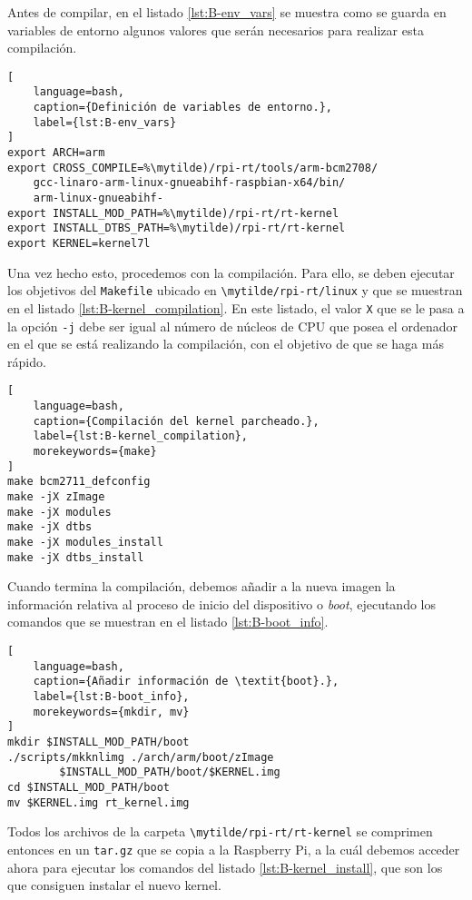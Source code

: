 Antes de compilar, en el listado \ref{lst:B-env_vars} se muestra como se guarda
en variables de entorno algunos valores que serán necesarios para realizar esta
compilación.

\begin{lstlisting}[
    language=bash,
    caption={Definición de variables de entorno.},
    label={lst:B-env_vars}
]
export ARCH=arm
export CROSS_COMPILE=%\mytilde)/rpi-rt/tools/arm-bcm2708/
    gcc-linaro-arm-linux-gnueabihf-raspbian-x64/bin/
    arm-linux-gnueabihf-
export INSTALL_MOD_PATH=%\mytilde)/rpi-rt/rt-kernel
export INSTALL_DTBS_PATH=%\mytilde)/rpi-rt/rt-kernel
export KERNEL=kernel7l
\end{lstlisting}

Una vez hecho esto, procedemos con la compilación. Para ello, se deben ejecutar
los objetivos del \texttt{Makefile} ubicado en \lstinline{\mytilde/rpi-rt/linux}
y que se muestran en el listado \ref{lst:B-kernel_compilation}. En este listado,
el valor \texttt{X} que se le pasa a la opción \texttt{-j} debe ser igual al
número de núcleos de CPU que posea el ordenador en el que se está realizando la
compilación, con el objetivo de que se haga más rápido.

\begin{lstlisting}[
    language=bash,
    caption={Compilación del kernel parcheado.},
    label={lst:B-kernel_compilation},
    morekeywords={make}
]
make bcm2711_defconfig
make -jX zImage
make -jX modules
make -jX dtbs
make -jX modules_install
make -jX dtbs_install
\end{lstlisting}

Cuando termina la compilación, debemos añadir a la nueva imagen la información
relativa al proceso de inicio del dispositivo o \textit{boot}, ejecutando los
comandos que se muestran en el listado \ref{lst:B-boot_info}.

\begin{lstlisting}[
    language=bash,
    caption={Añadir información de \textit{boot}.},
    label={lst:B-boot_info},
    morekeywords={mkdir, mv}
]
mkdir $INSTALL_MOD_PATH/boot
./scripts/mkknlimg ./arch/arm/boot/zImage
        $INSTALL_MOD_PATH/boot/$KERNEL.img
cd $INSTALL_MOD_PATH/boot
mv $KERNEL.img rt_kernel.img
\end{lstlisting}

Todos los archivos de la carpeta \lstinline{\mytilde/rpi-rt/rt-kernel} se
comprimen entonces en un \texttt{tar.gz} que se copia a la Raspberry Pi, a la
cuál debemos acceder ahora para ejecutar los comandos del listado
\ref{lst:B-kernel_install}, que son los que consiguen instalar el nuevo kernel.

